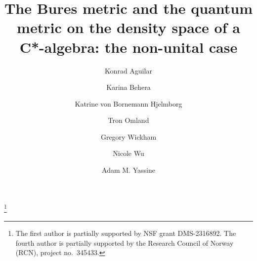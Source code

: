 \documentclass{amsart}
\theoremstyle{plain}
\theoremstyle{definition}
\theoremstyle{remark}
\numberwithin{equation}{section}
\begin{document}
\title[Bures metric, quantum metric, non-unital C*-algebras]{The Bures metric and the quantum metric on the density space of a C*-algebra: the non-unital case}
\author[K. Aguilar]{Konrad Aguilar}
\address{Department of Mathematics and Statistics, Pomona College, 610 N. College Ave., Claremont, CA 91711} 
\thanks{The  first  author is partially supported by NSF grant DMS-2316892. The fourth author is partially supported by the Research Council of Norway (RCN), project no.~345433.}
 
\author[K. Behera]{Karina Behera}
\address{Department of Mathematics and Statistics, Pomona College, 610 N. College Ave., Claremont, CA 91711} 

\author[K. von Bornemann Hjelmborg]{Katrine von Bornemann Hjelmborg}
\address{Department of Mathematics and Computer Science, The University of Southern Denmark, Campusvej 55, DK-5230 Odense M, Denmark}

\author[T. Omland]{Tron Omland}
\address{Norwegian National Security Authority (NSM) and Department of Mathematics, University of Oslo, Norway}

 \author[G. Wickham]{Gregory Wickham}
 \address{Department of Mathematics, Harvey Mudd College, 320 E. Foothill Blvd., Claremont, CA 91711}

  \author[N. Wu]{Nicole Wu}
 \address{Department of Mathematics, Harvey Mudd College, 320 E. Foothill Blvd., Claremont, CA 91711}

 \author[A. M. Yassine]{Adam M. Yassine}
 \address{Department of Mathematics and Statistics, Pomona College, 610 N. College Ave., Claremont, CA 91711}
 


\maketitle
\end{document}

